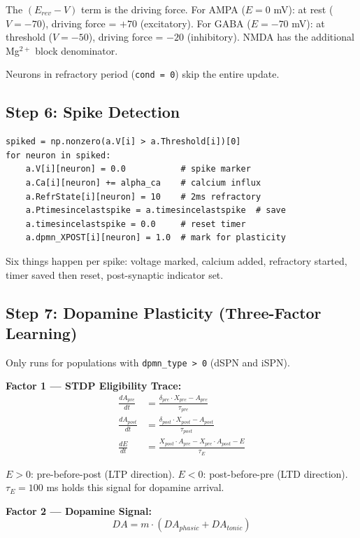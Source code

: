 \documentclass[11pt,a4paper]{article}
\begin{document}
The $(E_{rev} - V)$ term is the driving force. For AMPA ($E = 0$ mV): at rest ($V = -70$), driving force = $+70$ (excitatory). For GABA ($E = -70$ mV): at threshold ($V = -50$), driving force = $-20$ (inhibitory). NMDA has the additional Mg$^{2+}$ block denominator.

Neurons in refractory period (\texttt{cond = 0}) skip the entire update.

\subsection{Step 6: Spike Detection}

\begin{lstlisting}
spiked = np.nonzero(a.V[i] > a.Threshold[i])[0]
for neuron in spiked:
    a.V[i][neuron] = 0.0           # spike marker
    a.Ca[i][neuron] += alpha_ca    # calcium influx
    a.RefrState[i][neuron] = 10    # 2ms refractory
    a.Ptimesincelastspike = a.timesincelastspike  # save
    a.timesincelastspike = 0.0     # reset timer
    a.dpmn_XPOST[i][neuron] = 1.0  # mark for plasticity
\end{lstlisting}

Six things happen per spike: voltage marked, calcium added, refractory started, timer saved then reset, post-synaptic indicator set.

\subsection{Step 7: Dopamine Plasticity (Three-Factor Learning)}

Only runs for populations with \texttt{dpmn\_type > 0} (dSPN and iSPN).

\textbf{Factor 1 --- STDP Eligibility Trace:}
\begin{align}
\frac{dA_{pre}}{dt} &= \frac{\delta_{pre} \cdot X_{pre} - A_{pre}}{\tau_{pre}} \\
\frac{dA_{post}}{dt} &= \frac{\delta_{post} \cdot X_{post} - A_{post}}{\tau_{post}} \\
\frac{dE}{dt} &= \frac{X_{post} \cdot A_{pre} - X_{pre} \cdot A_{post} - E}{\tau_E}
\end{align}

$E > 0$: pre-before-post (LTP direction). $E < 0$: post-before-pre (LTD direction). $\tau_E = 100$ ms holds this signal for dopamine arrival.

\textbf{Factor 2 --- Dopamine Signal:}
\begin{equation}
DA = m \cdot (DA_{phasic} + DA_{tonic})
\end{equation}
\end{document}
